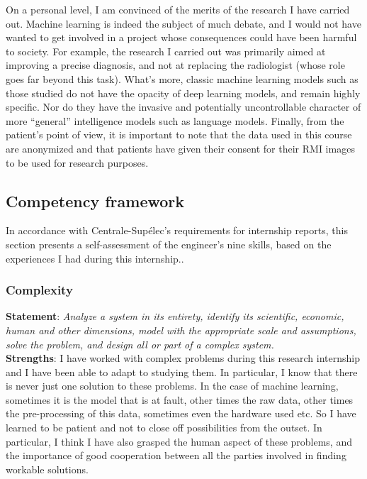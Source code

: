 \documentclass[preprint,12pt]{elsarticle}
\begin{document}
\indent On a personal level, I am convinced of the merits of the research I have carried out. Machine learning is indeed the subject of much debate, and I would not have wanted to get involved in a project whose consequences could have been harmful to society. For example, the research I carried out was primarily aimed at improving a precise diagnosis, and not at replacing the radiologist (whose role goes far beyond this task). What's more, classic machine learning models such as those studied do not have the opacity of deep learning models, and remain highly specific. Nor do they have the invasive and potentially uncontrollable character of more “general” intelligence models such as language models. Finally, from the patient's point of view, it is important to note that the data used in this course are anonymized and that patients have given their consent for their RMI images to be used for research purposes.

\subsection{Competency framework}

\noindent In accordance with Centrale-Supélec's requirements for internship reports, this section presents a self-assessment of the engineer's nine skills, based on the experiences I had during this internship..\\

\subsubsection{Complexity}
\noindent \textbf{Statement}: \textit{ Analyze a system in its entirety, identify its scientific, economic, human and other dimensions, model with the appropriate scale and assumptions, solve the problem, and design all or part of a complex system.}\\[3 pt]

\noindent \textbf{Strengths}: I have worked with complex problems during this research internship and I have been able to adapt to studying them. In particular, I know that there is never just one solution to these problems. In the case of machine learning, sometimes it is the model that is at fault, other times the raw data, other times the pre-processing of this data, sometimes even the hardware used etc. So I have learned to be patient and not to close off possibilities from the outset. In particular, I think I have also grasped the human aspect of these problems, and the importance of good cooperation between all the parties involved in finding workable solutions.\\[3 pt] 
\end{document}
